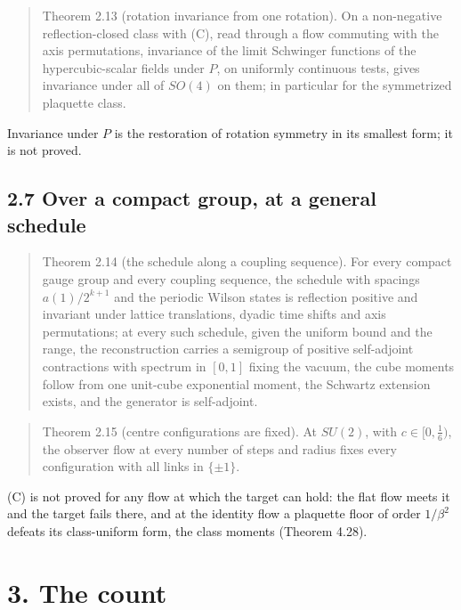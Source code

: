 \documentclass[10pt,letterpaper,twocolumn]{article}
\begin{document}
\begin{quote}
Theorem 2.13 (rotation invariance from one rotation). On a non-negative reflection-closed class with (C), read through a flow commuting with the axis permutations, invariance of the limit Schwinger functions of the hypercubic-scalar fields under \(P\), on uniformly continuous tests, gives invariance under all of \(SO(4)\) on them; in particular for the symmetrized plaquette class.
\end{quote}

Invariance under \(P\) is the restoration of rotation symmetry in its smallest form; it is not proved.

\subsection{2.7 Over a compact group, at a general schedule}\label{27-over-a-compact-group-at-a-general-schedule}

\begin{quote}
Theorem 2.14 (the schedule along a coupling sequence). For every compact gauge group and every coupling sequence, the schedule with spacings \(a(1)/2^{k+1}\) and the periodic Wilson states is reflection positive and invariant under lattice translations, dyadic time shifts and axis permutations; at every such schedule, given the uniform bound and the range, the reconstruction carries a semigroup of positive self-adjoint contractions with spectrum in \([0,1]\) fixing the vacuum, the cube moments follow from one unit-cube exponential moment, the Schwartz extension exists, and the generator is self-adjoint.
\end{quote}

\begin{quote}
Theorem 2.15 (centre configurations are fixed). At \(SU(2)\), with \(c\in[0,\tfrac16)\), the observer flow at every number of steps and radius fixes every configuration with all links in \(\{\pm1\}\).
\end{quote}

(C) is not proved for any flow at which the target can hold: the flat flow meets it and the target fails there, and at the identity flow a plaquette floor of order \(1/\beta^2\) defeats its class-uniform form, the class moments (Theorem 4.28).

\section{3. The count}\label{3-the-count}
\end{document}
